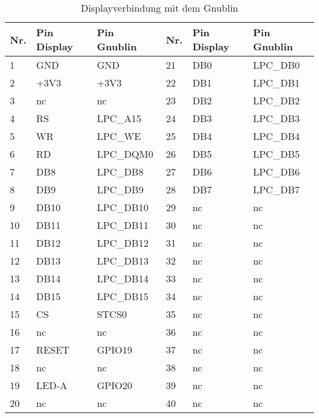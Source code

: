 \begin{table}[h]
\begin{tabular}{|p{0.6cm}|p{2.5cm}|p{2.5cm}|p{0.6cm}|p{2.5cm}|p{2.5cm}|}\hline
\rowcolor{TableBackgroundColor} 
\textbf{Nr.}	&	\textbf{Pin Display}	&	\textbf{Pin Gnublin}  & \textbf{Nr.}	&	\textbf{Pin Display}	&	\textbf{Pin Gnublin} 	\\ \hline
1				&	GND						&	GND					  &	21				&	DB0						&	LPC\_DB0				\\ \hline
2				&	+3V3					&	+3V3				  &	22				&	DB1						&	LPC\_DB1				\\ \hline
3				&	nc						&	nc				 	  & 23				&	DB2						&	LPC\_DB2				\\ \hline
4				&	RS						&	LPC\_A15	    	  &	24				&	DB3						&	LPC\_DB3				\\ \hline
5				&	WR						&	LPC\_WE				  &	25				&	DB4						&	LPC\_DB4				\\ \hline
6				&	RD						&	LPC\_DQM0			  &	26				&	DB5						&	LPC\_DB5				\\ \hline
7				&	DB8						&	LPC\_DB8			  &	27				&	DB6						&	LPC\_DB6				\\ \hline
8				&	DB9						&	LPC\_DB9			  &	28				&	DB7						&	LPC\_DB7				\\ \hline
9				&	DB10					&	LPC\_DB10			  &	29				&	nc						&	nc						\\ \hline
10				&	DB11					&	LPC\_DB11			  &	30				&	nc						&	nc						\\ \hline
11				&	DB12					&	LPC\_DB12			  &	31				&	nc						&	nc						\\ \hline
12				&	DB13					&	LPC\_DB13			  &	32				&	nc						&	nc						\\ \hline
13				&	DB14					&	LPC\_DB14			  &	33				&	nc						&	nc						\\ \hline
14				&	DB15					&	LPC\_DB15			  &	34				&	nc						&	nc						\\ \hline
15				&	CS						&	STCS0				  &	35				&	nc						&	nc						\\ \hline
16				&	nc						&	nc					  &	36				&	nc						&	nc						\\ \hline
17				&	RESET					&	GPIO19				  &	37				&	nc						&	nc						\\ \hline
18				&	nc						&	nc					  &	38				&	nc						&	nc						\\ \hline
19				&	LED-A					&	GPIO20				  &	39				&	nc						&	nc						\\ \hline
20				&	nc						&	nc				 	  &	40				&	nc						&	nc						\\ \hline

\end{tabular}
\caption{Displayverbindung mit dem Gnublin}
\label{tab:display_gnublin_verbindung}
\end{table}

